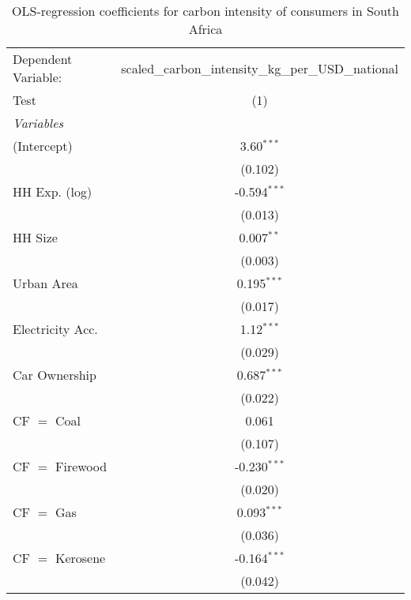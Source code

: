 
\begin{table}[htbp!]
   \centering
   \small
   \begin{adjustbox}{width = 1\textwidth, max height = 0.95\textheight, center}
      \begin{threeparttable}[b]
         \caption{\label{tab:OLS_1_ZAF} OLS-regression coefficients for carbon intensity of consumers in South Africa}
         \begin{tabular}{lc}
            \tabularnewline \midrule \midrule
            Dependent Variable: & scaled\_carbon\_intensity\_kg\_per\_USD\_national\\        
            Test                & (1)\\  
            \midrule
            \emph{Variables}\\
            (Intercept)         & 3.60$^{***}$\\   
                                & (0.102)\\   
            HH Exp. (log)       & -0.594$^{***}$\\   
                                & (0.013)\\   
            HH Size             & 0.007$^{**}$\\   
                                & (0.003)\\   
            Urban Area          & 0.195$^{***}$\\   
                                & (0.017)\\   
            Electricity Acc.    & 1.12$^{***}$\\   
                                & (0.029)\\   
            Car Ownership       & 0.687$^{***}$\\   
                                & (0.022)\\   
            CF $=$ Coal         & 0.061\\   
                                & (0.107)\\   
            CF $=$ Firewood     & -0.230$^{***}$\\   
                                & (0.020)\\   
            CF $=$ Gas          & 0.093$^{***}$\\   
                                & (0.036)\\   
            CF $=$ Kerosene     & -0.164$^{***}$\\   
                                & (0.042)\\   

\end{tabular}
\end{threeparttable}
\end{adjustbox}
\end{table}
